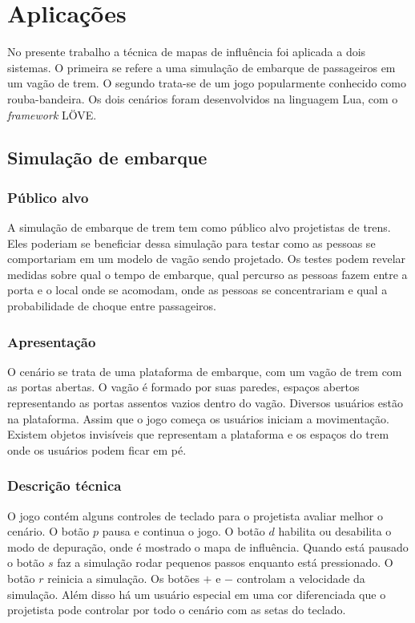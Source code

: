 \documentclass[a4paper]{article}
\begin{document}
\section{Aplicações}

No presente trabalho a técnica de mapas de influência foi aplicada a dois sistemas. O primeira se refere a uma simulação de embarque de passageiros em um vagão de trem. O segundo trata-se de um jogo popularmente conhecido como rouba-bandeira. Os dois cenários foram desenvolvidos na linguagem Lua, com o \textit{framework} LÖVE.

\subsection{Simulação de embarque}

\subsubsection{Público alvo}

A simulação de embarque de trem tem como público alvo projetistas de trens. Eles poderiam se beneficiar dessa simulação para testar como as pessoas se comportariam em um modelo de vagão sendo projetado. Os testes podem revelar medidas sobre qual o tempo de embarque, qual percurso as pessoas fazem entre a porta e o local onde se acomodam, onde as pessoas se concentrariam e qual a probabilidade de choque entre passageiros.

\subsubsection{Apresentação}

O cenário se trata de uma plataforma de embarque, com um vagão de trem com as portas abertas. O vagão é formado por suas paredes, espaços abertos representando as portas assentos vazios dentro do vagão. Diversos usuários estão na plataforma. Assim que o jogo começa os usuários iniciam a movimentação. Existem objetos invisíveis que representam a plataforma e os espaços do trem onde os usuários podem ficar em pé.

\subsubsection{Descrição técnica}

O jogo contém alguns controles de teclado para o projetista avaliar melhor o cenário. O botão $p$ pausa e continua o jogo. O botão $d$ habilita ou desabilita o modo de depuração, onde é mostrado o mapa de influência. Quando está pausado o botão $s$ faz a simulação rodar pequenos passos enquanto está pressionado. O botão $r$ reinicia a simulação. Os botões $+$ e $-$ controlam a velocidade da simulação. Além disso há um usuário especial em uma cor diferenciada que o projetista pode controlar por todo o cenário com as setas do teclado.
\end{document}
